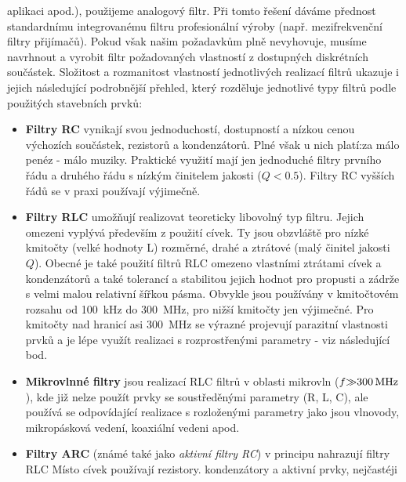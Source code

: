         aplikaci apod.), použijeme analogový filtr. Při tomto řešení dáváme přednost standardnímu
        integrovanému filtru profesionální výroby (např. mezifrekvenční filtry přijímačů). Pokud
        však našim požadavkům plně nevyhovuje, musíme navrhnout a vyrobit filtr požadovaných
        vlastností z dostupných diskrétních součástek. Složitost a rozmanitost vlastností
        jednotlivých realizací filtrů ukazuje i jejich následující podrobnější přehled, který
        rozděluje jednotlivé typy filtrů podle použitých stavebních prvků:
        \begin{itemize}
          \item \textbf{Filtry RC} vynikají svou jednoduchostí, dostupností a nízkou cenou výchozích
                součástek, rezistorů a kondenzátorů. Plné však u nich platí:za málo penéz - málo
                muziky. Praktické využití mají jen jednoduché filtry prvního řádu a druhého řádu s
                nízkým činitelem jakosti (\(Q < \num{0.5}\)). Filtry RC vyšších řádů se v praxi
                používají výjimečně.
          \item \textbf{Filtry RLC} umožňují realizovat teoreticky libovolný typ filtru. Jejich
                omezeni vyplývá především z použití cívek. Ty jsou obzvláště pro nízké kmitočty
                (velké hodnoty L) rozměrné, drahé a ztrátové (malý činitel jakosti \(Q\)). Obecné je
                také použití filtrů RLC omezeno vlastními ztrátami cívek a kondenzátorů a také
                tolerancí a stabilitou jejich hodnot pro propusti a zádrže s velmi malou relativní
                šířkou pásma. Obvykle jsou používány v kmitočtovém rozsahu od \SI{100}{\kilo\hertz}
                do \SI{300}{\mega\hertz}, pro nižší kmitočty jen výjimečné. Pro kmitočty nad
                hranicí asi \SI{300}{\mega\hertz} se výrazné projevují parazitní vlastnosti prvků a
                je lépe využít realizaci s rozprostřenými parametry - viz následující bod.
          \item \textbf{Mikrovlnné filtry} jsou realizací RLC filtrů v oblasti mikrovln (\(f
                \SI{>>300}{\mega\hertz}\)), kde již nelze použít prvky se soustředěnými parametry
                (R, L, C), ale používá se odpovídající realizace s rozloženými parametry jako jsou
                vlnovody, mikropásková vedení, koaxiální vedeni apod.
          \item \textbf{Filtry ARC} (známé také jako \emph{aktivní filtry RC}) v principu nahrazují
                filtry RLC Místo cívek používají rezistory. kondenzátory a aktivní prvky, nejčastéji

\end{itemize}
